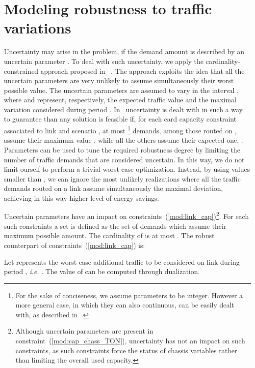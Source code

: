 \documentclass[final,5p,times,twocolumn]{elsarticle}
\begin{document}
\section{Modeling robustness to traffic variations}\label{sec:robust}
Uncertainty may arise in the problem, if the demand amount is described by an uncertain parameter  . To deal with such uncertainty, we apply the cardinality-constrained approach proposed in~ \cite{bertsimas11}. The approach exploits the idea that all the uncertain parameters are very unlikely to assume simultaneously their worst possible value.  The uncertain parameters are assumed to vary in the interval , where  and  represent, respectively, the expected traffic value and the maximal variation considered during period . In~\cite{bertsimas11} uncertainty is dealt with in such a way to guarantee than any solution is
feasible if, for each card capacity constraint associated to link  and scenario , at most \footnote{For the sake of conciseness, we assume parameters  to be integer. However a more general case, in which they can also continuous, can be easily dealt with, as described in~\cite{bertsimas11}.} demands, among those routed on , assume their maximum value , while all the others assume their expected one, . 
Parameters  can be used to tune the required robustness degree by limiting the number of traffic demands that are considered uncertain. In this way, we do not limit ourself to perform a trivial worst-case optimization. Instead, by using  values smaller than , we can ignore the most unlikely realizations where all the traffic demands routed on a link  assume simultaneously the maximal deviation, achieving in this way higher level of energy savings.

Uncertain parameters have an impact on constraints~(\ref{mod:link_cap})\footnote{Although uncertain parameters are present in constraint~(\ref{mod:cap_chass_TON}), uncertainty has not an impact on such constraints, as such constraints force the status of chassis variables rather than limiting the overall used capacity.}. For each such constraints a set   is defined as the set of demands which assume their maximum possible amount. The cardinality of  is at most . The robust counterpart of constraints~(\ref{mod:link_cap}) is:






Let  represents the worst case additional traffic to be considered on link  during period , \textit{i.e.} . 
The value of  can be computed through dualization.
\end{document}
